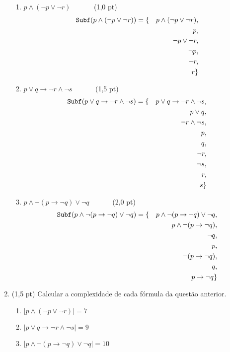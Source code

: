 \documentclass[12pt,a4paper,oneside]{article}
\begin{document}
\begin{enumerate}
		\begin{enumerate}
			\item $p \wedge (\neg p \vee \neg r)$  \ \ \ \ \ \ (1,0 pt)
			{\color{verde} \begin{eqnarray*}
								{\tt Subf}(p \wedge (\neg p \vee \neg r)) & =  \{ & p \wedge (\neg p \vee \neg r),\\
								& & p, \\
								& & \neg p \vee \neg r, \\
								& & \neg p, \\
								& & \neg r, \\
								& & r \}
						\end{eqnarray*}
					}
			\item $p \vee q \rightarrow \neg r \wedge \neg s$  \ \ \ \ \ \ (1,5 pt)
			{\color{verde} \begin{eqnarray*}
								{\tt Subf}(p \vee q \rightarrow \neg r \wedge \neg s) & =  \{ & p \vee q \rightarrow \neg r \wedge \neg s,\\
								& & p \vee q, \\
								& & \neg r \wedge \neg s, \\
								& & p, \\
								& & q, \\
								& & \neg r, \\
								& & \neg s, \\
								& & r, \\
								& & s \}
						\end{eqnarray*}
					}
			\item $p \wedge \neg (p \rightarrow \neg q) \vee \neg q$  \ \ \ \ \ \ (2,0 pt)
			{\color{verde} \begin{eqnarray*} 
				  {\tt Subf}(p \wedge \neg (p \rightarrow \neg q) \vee \neg q) & = \{ & p \wedge \neg (p \rightarrow \neg q) \vee \neg q,\\
				  		& & p \wedge \neg (p \rightarrow \neg q),\\
				  		& & \neg q,\\
				  		& & p,\\
				  		& & \neg (p \rightarrow \neg q),\\
				  		& & q,\\
				  		& & p \rightarrow \neg q\}
				  	\end{eqnarray*}
				  }
		\end{enumerate}	
		
	\item (1,5 pt) Calcular a complexidade de cada fórmula da questão anterior.
	\begin{enumerate}
			\item {\color{verde} $|p \wedge (\neg p \vee \neg r)| = 7$}
			\item {\color{verde} $|p \vee q \rightarrow \neg r \wedge \neg s| = 9$}
			\item {\color{verde} $|p \wedge \neg (p \rightarrow \neg q) \vee \neg q| = 10$}
		\end{enumerate}
	
\end{enumerate}
\end{document}
